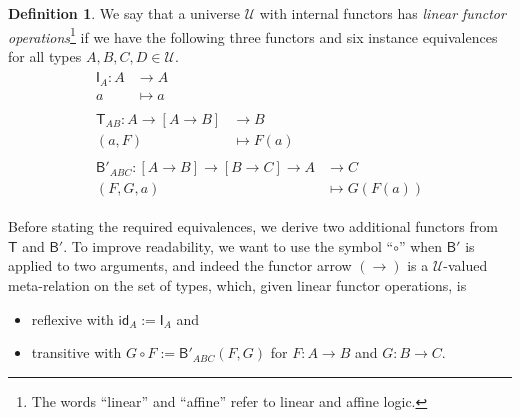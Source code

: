 \documentclass[a4paper]{article}
\theoremstyle{definition}
\newtheorem{definition}{Definition}[section]
\theoremstyle{remark}
\newcommand{\defn}{\emph}
\newcommand{\U}{\mathcal{U}}
\newcommand{\nm}{\mathsf}
\newcommand{\id}{\nm{id}}
\newcommand{\combinator}{\nm}
\newcommand{\idFun}{\combinator{I}}
\newcommand{\revAppFun}{\combinator{T}}
\newcommand{\compFun}{\combinator{B'}}
\begin{document}
\begin{definition}
  We say that a universe $\U$ with internal functors has \defn{linear functor
  operations}\footnote{The words ``linear'' and ``affine'' refer to linear and affine logic.}
  if we have the following three functors and six instance equivalences for all types
  $A,B,C,D \in \U.$
  \vspace{1ex}
  \begin{gather*}
    \begin{aligned}
      \idFun_A : A &\to     A\\
                 a &\mapsto a
    \end{aligned}\\[1em]
    \begin{aligned}
      \revAppFun_{AB} : A \to [A \to B] &\to     B\\
                        (a,F)           &\mapsto F(a)
    \end{aligned}\\[1em]
    \begin{aligned}
      \compFun_{ABC} : [A \to B] \to [B \to C] \to A &\to     C\\
                       (F,G,a)                       &\mapsto G(F(a))
    \end{aligned}
  \end{gather*}

  Before stating the required equivalences, we derive two additional functors from $\revAppFun$
  and $\compFun.$
  To improve readability, we want to use the symbol ``$\circ$'' when $\compFun$ is applied to
  two arguments, and indeed the functor arrow $(\to)$ is a $\U$-valued meta-relation on the
  set of types, which, given linear functor operations, is
  \begin{itemize}
    \item reflexive with $\id_A := \idFun_A$ and
    \item transitive with $G \circ F := \compFun_{ABC}(F,G)$ for $F : A \to B$ and
    $G : B \to C.$
  \end{itemize}


\end{definition}
\end{document}

